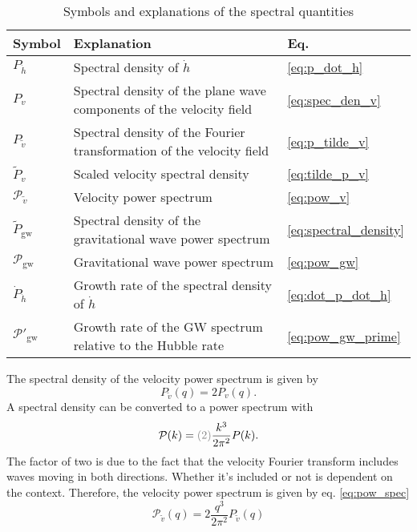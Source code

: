 \begin{table}[ht]
\caption{Symbols and explanations of the spectral quantities}
\begin{tabular}{l|l|l}
Symbol & Explanation & Eq.\\
\hline
$P_{\dot{h}}$ & Spectral density of $\dot{h}$ & \eqref{eq:p_dot_h} \\
$P_v$ & Spectral density of the plane wave components of the velocity field & \eqref{eq:spec_den_v} \\
$P_{\tilde{v}}$ & Spectral density of the Fourier transformation of the velocity field & \eqref{eq:p_tilde_v} \\
$\tilde{P}_v$ & Scaled velocity spectral density & \eqref{eq:tilde_p_v} \\
$\mathcal{P}_{\tilde{v}}$ & Velocity power spectrum & \eqref{eq:pow_v} \\
$\tilde{P}_\text{gw}$ & Spectral density of the gravitational wave power spectrum & \eqref{eq:spectral_density} \\
$\mathcal{P}_\text{gw}$ & Gravitational wave power spectrum & \eqref{eq:pow_gw} \\
$\dot{P}_{\dot{h}}$ & Growth rate of the spectral density of $\dot{h}$ & \eqref{eq:dot_p_dot_h} \\
$\mathcal{P}'_{\text{gw}}$ & Growth rate of the GW spectrum relative to the Hubble rate & \eqref{eq:pow_gw_prime}
\end{tabular}
\label{table:symbols}
\end{table}

The spectral density of the velocity power spectrum is given by
\begin{equation}
P_{\tilde{v}} (q) = 2 P_v (q).
\label{eq:p_tilde_v}
\end{equation}
A spectral density can be converted to a power spectrum with
\begin{equation}
\mathcal{P}(k) = \textcolor{gray}{(2)} \frac{k^3}{2 \pi^2} P(k).
\label{eq:pow_spec}
\end{equation}
The factor of two is due to the fact that the velocity Fourier transform includes waves moving in both directions.
Whether it's included or not is dependent on the context.
Therefore, the velocity power spectrum is given by eq. \eqref{eq:pow_spec} \cite[eq. 4.18]{hindmarsh_gw_pt_2019}
\begin{equation}
\mathcal{P}_{\tilde{v}} (q) = 2 \frac{q^3}{2\pi^2} P_{\tilde{v}} (q)
\label{eq:pow_v}
\end{equation}

